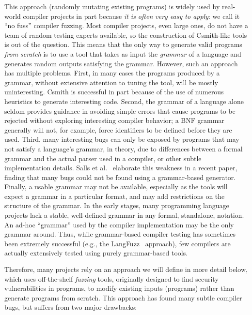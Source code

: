 This approach (randomly mutating existing programs) is widely used by
real-world compiler projects in part because \emph{it is often very easy to
  apply}: we call it ``no fuss'' compiler fuzzing.  Most compiler projects, even large ones, do not have a team
of random testing experts available, so the construction of
Csmith-like tools is out of the question.  This means that the only
way to generate valid programs \emph{from scratch} is to use a tool that takes as
input the \emph{grammar} of a language and generates random outputs
satisfying the grammar.   However, such an approach has multiple problems.
First, in many cases the programs produced by a grammar, without
extensive attention to tuning the tool, will be mostly uninteresting.
Csmith is successful in part because of the use of numerous heuristics
to generate interesting code.  Second, the grammar of a language alone
seldom provides guidance in avoiding simple errors that cause programs
to be rejected without exploring interesting compiler behavior; a BNF
grammar generally will not, for example, force identifiers to be
defined before they are used.  Third, many interesting bugs can only
be exposed by programs that may not satisfy a language's grammar, in
theory, due to differences between a formal grammar and the actual
parser used in a compiler, or other subtle implementation details.
Salls et al.~\cite{Salls2021TokenLevel} elaborate this weakness in a
recent paper, finding that many bugs could not be found using a
grammar-based generator.
Finally, a usable grammar may not be available, especially as the
tools will expect a grammar in a particular format, and may add
restrictions on the structure of the grammar.  In the early stages,
many programming language projects lack a stable, well-defined
grammar in any formal, standalone, notation.  An ad-hoc ``grammar'' used by the compiler implementation may be the
only grammar around.  Thus, while grammar-based compiler
testing has sometimes been extremely successful (e.g., the
LangFuzz~\cite{LangFuzz} approach), few compilers are actually
extensively tested using purely grammar-based tools.

Therefore, many projects rely on an approach we will define in more
detail below, which uses off-the-shelf \emph{fuzzing} tools,
originally designed to find security vulnerabilities in programs, to
modify existing inputs (programs) rather than generate programs from
scratch.  This approach has found many subtle compiler bugs, but
suffers from two major drawbacks:

